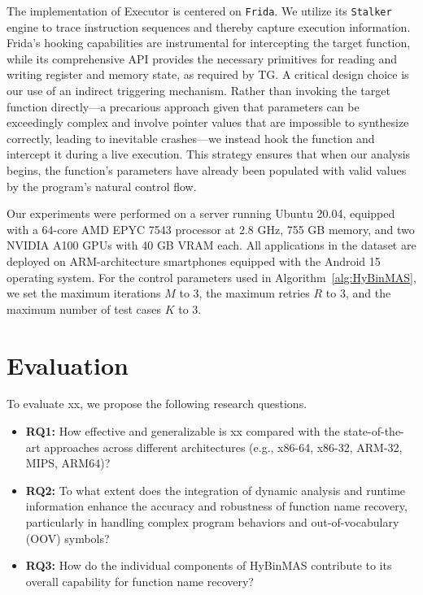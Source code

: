 \documentclass[acmsmall,screen,review,anonymous]{acmart} %
\begin{document}
The implementation of Executor is centered on \texttt{Frida}. We utilize its \texttt{Stalker} engine to trace instruction sequences and thereby capture execution information. Frida's hooking capabilities are instrumental for intercepting the target function, while its comprehensive API provides the necessary primitives for reading and writing register and memory state, as required by TG. A critical design choice is our use of an indirect triggering mechanism. Rather than invoking the target function directly---a precarious approach given that parameters can be exceedingly complex and involve pointer values that are impossible to synthesize correctly, leading to inevitable crashes---we instead hook the function and intercept it during a live execution. This strategy ensures that when our analysis begins, the function's parameters have already been populated with valid values by the program's natural control flow.

Our experiments were performed on a server running Ubuntu 20.04, equipped with a 64-core AMD EPYC 7543 processor at 2.8 GHz, 755 GB memory, and two NVIDIA A100 GPUs with 40 GB VRAM each. All applications in the dataset are deployed on ARM-architecture smartphones equipped with the Android 15 operating system. For the control parameters used in Algorithm~\ref{alg:HyBinMAS}, we set the maximum iterations $M$ to 3, the maximum retries $R$ to 3, and the maximum number of test cases $K$ to 3.


\section{Evaluation}
To evaluate xx, we propose the following research questions.
\begin{itemize}
    \item \textbf{RQ1:} How effective and generalizable is xx compared with the state-of-the-art approaches across different architectures (e.g., x86-64, x86-32, ARM-32, MIPS, ARM64)?
    \item \textbf{RQ2:} To what extent does the integration of dynamic analysis and runtime information enhance the accuracy and robustness of function name recovery, particularly in handling complex program behaviors and out-of-vocabulary (OOV) symbols?
    \item \textbf{RQ3:} How do the individual components of HyBinMAS contribute to its overall capability for function name recovery? %
\end{itemize}
\end{document}
